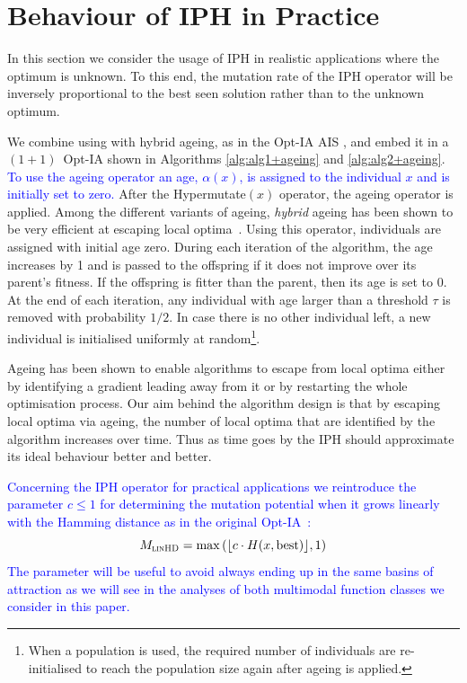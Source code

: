 \documentclass[lettersize,journal]{IEEEtran}
\newcommand{\new}[1]{\textcolor{blue}{#1}}
\begin{document}
 	
 	\section{Behaviour of IPH in Practice}

In this section we consider the usage of IPH %
in realistic applications where the optimum is unknown.
 To this end, the mutation rate of the IPH operator will be inversely proportional to the best seen solution rather than to the unknown optimum. 
 
 We combine \IPHfcm{} using {\linHD } with hybrid ageing, as in the Opt-IA AIS \cite{CutelloNicosiaPavoneTimmis2007}, and embed it in a $(1+1)$~Opt-IA shown in Algorithms \ref{alg:alg1+ageing} and \ref{alg:alg2+ageing}. \new{To use the ageing operator an age, $\alpha(x)$, is assigned to the individual $x$ and is initially set to zero.} After the Hypermutate$(x)$ operator, %
 	the ageing operator is applied.
 	Among the different variants of ageing, {\it hybrid} ageing has been shown to be very efficient at escaping local optima~\cite{OlivetoSudholt2014ageing,CorusOlivetoYazdaniGECCO2017,CorusOlivetoYazdaniPPSN2018Approx}. Using this operator,  individuals are assigned with initial age zero. During each iteration of the algorithm, the age  increases by 1 and is passed to the offspring if it does not improve over its parent's fitness. If the offspring is fitter than the parent, then its age is set to 0. At the end of each iteration, any individual with age larger than a threshold $\tau$ is removed with probability $1/2$. In case there is no other individual left, a new individual is initialised uniformly at random\footnote{When a population is used, the required number of individuals are re-initialised to reach the population size again after ageing is applied.}. 
 
 Ageing has been shown to enable algorithms to escape from local optima either by identifying a gradient leading away from it or by restarting the whole optimisation process. Our aim behind the algorithm design is that by escaping local optima via ageing, the number of local optima that are identified by the algorithm increases over time. Thus as time goes by the IPH should approximate its ideal behaviour better and better.
 
 \textcolor{blue}{Concerning the IPH operator for practical applications we  reintroduce the parameter $c\leq 1$ for determining the mutation potential when it grows linearly with the Hamming distance as in the original Opt-IA~\cite{JansenZarges2011}:}  
 \textcolor{blue}{
 $$M_\textsc{linHD} = \max\left(\lfloor c \cdot H(x,\text{best}) \rfloor, 1 \right) $$
 }
\textcolor{blue}{The parameter will be useful to avoid always ending up in the same basins of attraction as we will see in the analyses of both multimodal function classes we consider in this paper.} %
\end{document}
